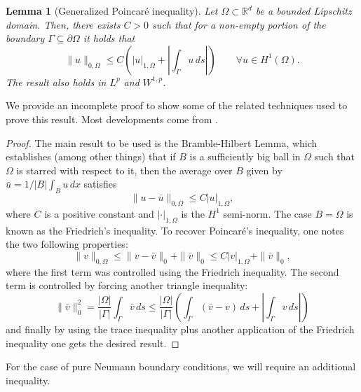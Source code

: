 \documentclass{article}
\newtheorem{lemma}{Lemma}
\begin{document}
\begin{lemma}[Generalized Poincaré inequality] Let $\Omega\subset\mathbb{R}^d$ be a bounded Lipschitz domain. Then, there exists $C>0$ such that for a non-empty portion of the boundary $\Gamma \subseteq \partial\Omega$ it holds that
        $$ \| u \|_{0,\Omega} \leq C\left(| u |_{1,\Omega} + \left|\int_\Gamma u\,ds\right| \right) \qquad \forall u \in H^1(\Omega). $$
The result also holds in $L^p$ and $W^{1,p}$. 
\end{lemma}

We provide an incomplete proof to show some of the related techniques used to prove this result. Most developments come from \cite{brenner2008mathematical}.
\begin{proof}
    The main result to be used is the Bramble-Hilbert Lemma, which establishes (among other things) that if $B$ is a sufficiently big ball in $\Omega$ such that $\Omega$ is starred with respect to it, then the average over $B$ given by $\bar u = 1/|B|\int_B u\,dx$ satisfies
    $$ \| u - \bar u \|_{0,\Omega} \leq C| u |_{1,\Omega}, $$
where $C$ is a positive constant and $|\cdot|_{1,\Omega}$ is the $H^1$ semi-norm. The case $B=\Omega$ is known as the Friedrich's inequality. To recover Poincaré's inequality, one notes the two following properties: 
    $$ \|v \|_{0,\Omega} \leq \| v - \bar v\|_0 + \| \bar v\|_0 \leq C | v |_{1,\Omega} + \|\bar v\|_0,$$
where the first term was controlled using the Friedrich inequality. The second term is controlled by forcing another triangle inequality: 
    $$ \| \bar v\|^2_0 = \frac{|\Omega|}{|\Gamma|} \int_\Gamma \bar v\,ds \leq \frac{|\Omega|}{|\Gamma|}\left(\int_\Gamma (\bar v - v)\,ds + \left| \int_\Gamma v \,ds \right| \right)$$
and finally by using the trace inequality plus another application of the Friedrich inequality one gets the desired result. 
\end{proof}

For the case of pure Neumann boundary conditions, we will require an additional inequality.
\end{document}
